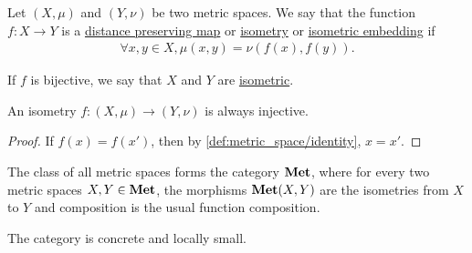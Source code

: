 \begin{definition}\label{def:isometry}\cite[253]{Engelking1989}
  Let $(X, \mu)$ and $(Y, \nu)$ be two metric spaces. We say that the function $f: X \to Y$ is a \ul{distance preserving map} or \ul{isometry} or \ul{isometric embedding} if
  \begin{align*}
    \forall x, y \in X, \mu(x, y) = \nu(f(x), f(y)).
  \end{align*}

  If $f$ is bijective, we say that $X$ and $Y$ are \ul{isometric}.
\end{definition}

\begin{proposition}\label{def:isometry_is_injective}
  An isometry $f: (X, \mu) \to (Y, \nu)$ is always injective.
\end{proposition}
\begin{proof}
  If $f(x) = f(x')$, then by \ref{def:metric_space/identity}, $x = x'$.
\end{proof}

\begin{definition}\label{def:category_of_metric_spaces}
  The class of all metric spaces forms the category $\operatorname{\mathbf{Met}}$, where for every two metric spaces $X, Y \in \operatorname{\mathbf{Met}}$, the morphisms $\operatorname{\mathbf{Met}}(X, Y)$ are the isometries from $X$ to $Y$ and composition is the usual function composition.

  The category is concrete and locally small.
\end{definition}
